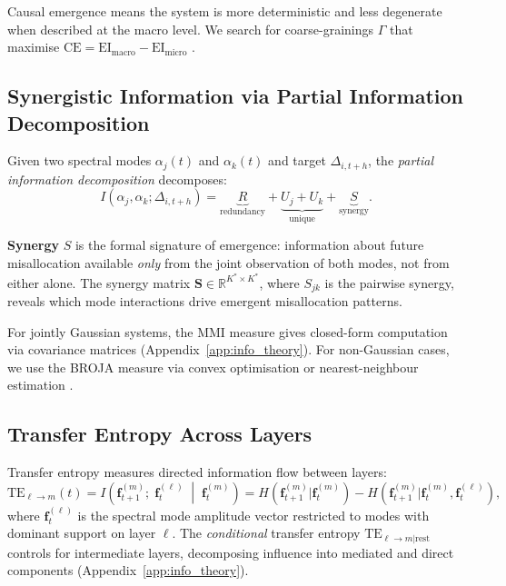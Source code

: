 \documentclass[11pt,a4paper]{article}
\theoremstyle{definition}
\newcommand{\R}{\mathbb{R}}
\newcommand{\bff}{\bm{f}}
\begin{document}
Causal emergence means the system is more deterministic and less degenerate when described at the macro level. We search for coarse-grainings $\Gamma$ that maximise $\mathrm{CE} = \mathrm{EI}_{\mathrm{macro}} - \mathrm{EI}_{\mathrm{micro}}$ \citep{hoel2017map,rosas2020reconciling}.

\subsection{Synergistic Information via Partial Information Decomposition}
\label{sec:pid}

Given two spectral modes $\alpha_j(t)$ and $\alpha_k(t)$ and target $\Delta_{i,t+h}$, the \emph{partial information decomposition} \citep{williams2010nonnegative} decomposes:
\begin{equation}
  I(\alpha_j, \alpha_k; \Delta_{i,t+h}) = \underbrace{R}_{\text{redundancy}} + \underbrace{U_j + U_k}_{\text{unique}} + \underbrace{S}_{\text{synergy}}.
  \label{eq:pid}
\end{equation}

\textbf{Synergy} $S$ is the formal signature of emergence: information about future misallocation available \emph{only} from the joint observation of both modes, not from either alone. The synergy matrix $\mathbf{S} \in \R^{K^* \times K^*}$, where $S_{jk}$ is the pairwise synergy, reveals which mode interactions drive emergent misallocation patterns.

For jointly Gaussian systems, the MMI measure gives closed-form computation via covariance matrices (Appendix~\ref{app:info_theory}). For non-Gaussian cases, we use the BROJA measure via convex optimisation \citep{bertschinger2014quantifying} or nearest-neighbour estimation \citep{ehrlich2024pid}.

\subsection{Transfer Entropy Across Layers}
\label{sec:transfer_entropy}

Transfer entropy \citep{schreiber2000measuring} measures directed information flow between layers:
\begin{equation}
  \mathrm{TE}_{\ell \to m}(t) = I\!\left(\bff^{(m)}_{t+1};\; \bff^{(\ell)}_t \;\middle|\; \bff^{(m)}_t\right) = H\!\left(\bff^{(m)}_{t+1} | \bff^{(m)}_t\right) - H\!\left(\bff^{(m)}_{t+1} | \bff^{(m)}_t, \bff^{(\ell)}_t\right),
  \label{eq:te}
\end{equation}
where $\bff^{(\ell)}_t$ is the spectral mode amplitude vector restricted to modes with dominant support on layer $\ell$. The \emph{conditional} transfer entropy $\mathrm{TE}_{\ell \to m | \mathrm{rest}}$ controls for intermediate layers, decomposing influence into mediated and direct components (Appendix~\ref{app:info_theory}).
\end{document}
